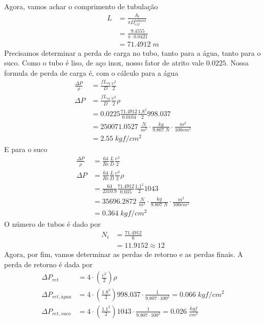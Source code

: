 Agora, vamos achar o comprimento de tubulação
\begin{align}
    L &= \frac{A_{t}}{\pi D_{ext}^{tubo int}}\\
    &= \frac{9.4555}{\pi \cdot 0.0421}\\
    &= 71.4912 \; m
\end{align}
Precisamos determinar a perda de carga no tubo, tanto para a água, tanto para o suco. Como o tubo é
liso, de aço inox, nosso fator de atrito vale \(0.0225\). Nossa formula de perda de carga é, com o
cálculo para a água
\begin{align}
    \frac{\Delta P}{\rho } &= \frac{fL_{eq} }{D} \frac{\upsilon ^{2}}{2}\\
    \Delta P &= \frac{fL_{eq} }{D} \frac{\upsilon ^{2}}{2} \rho\\
    &= 0.0225 \frac{71.4912}{0.0104} \frac{1.8^{2}}{2} 998.037\\
    &= 250071.0527 \; \frac{N}{m^{2} } \cdot \frac{kg}{9.807\;N}\cdot \frac{m^{2} }{100cm^{2}}\\
    &= 2.55 \; kgf/cm^{2}
\end{align}
E para o suco
\begin{align}
    \frac{\Delta P}{\rho } &= \frac{64}{Re}\frac{L}{D}\frac{\upsilon^{2}}{2}\\
    \Delta P &= \frac{64}{Re}\frac{L}{D}\frac{\upsilon^{2}}{2} \rho\\
    &= \frac{64}{2310.9}\frac{71.4912}{0.035}\frac{1.1^{2}}{2} 1043\\
    &= 35696.2872 \; \frac{N}{m^{2} } \cdot \frac{kg}{9.807\;N}\cdot \frac{m^{2} }{100cm^{2}}\\  
    &= 0.364 \; kgf/cm^{2}
\end{align}
O número de tubos é dado por
\begin{align}
    N_{t} &= \frac{71.4912}{6}\\
    &=11.9152 \approx 12
\end{align}
Agora, por fim, vamos determinar as perdas de retorno e as perdas finais. A perda de retorno é dada
por
\begin{align}
    \Delta P_{ret} &= 4 \cdot \left( \frac{\upsilon^{2}}{2}  \right) \rho \\
    \Delta P_{ret, \acute{a}gua} &= 4 \cdot \left( \frac{1.8^{2}}{2}  \right) 998.037 \cdot \frac{1}{9.807 \cdot 100^{2} } =  0.066 \; kgf/cm^{2}\\
    \Delta P_{ret, suco} &= 4 \cdot \left( \frac{1.1^{2}}{2}  \right) 1043 \cdot \frac{1}{9.807 \cdot 100^{2} } = 0.026 \; \frac{kgf}{cm^{2}} \\
\end{align}
